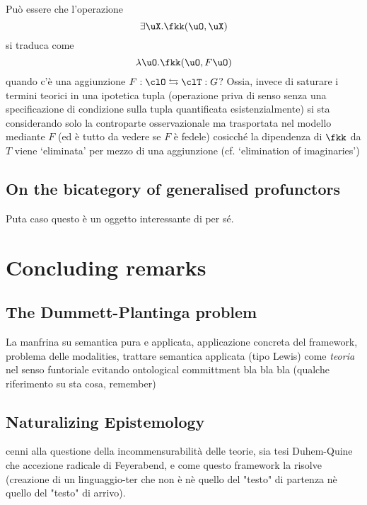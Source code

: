 \documentclass[a4paper]{../birkjour}
\begin{document}
Può essere che l'operazione 
\[\exists \uX . \fkk(\uO, \uX)\]
si traduca come 
\[\lambda \uO.\fkk(\uO, F\uO)\]
quando c'è una aggiunzione $F : \clO \leftrightarrows \clT : G$? Ossia, invece di saturare i termini teorici in una ipotetica tupla (operazione priva di senso senza una specificazione di condizione sulla tupla quantificata esistenzialmente) si sta considerando solo la controparte osservazionale ma trasportata nel modello mediante $F$ (ed è tutto da vedere se $F$ è fedele) cosicché la dipendenza di $\fkk$ da $T$ viene `eliminata' per mezzo di una aggiunzione (cf. `elimination of imaginaries')
\subsection{On the bicategory of generalised profunctors}
Puta caso questo è un oggetto interessante di per sé.

\section{Concluding remarks}

\subsection{The Dummett-Plantinga problem}
La manfrina su semantica pura e applicata, applicazione concreta del framework, problema delle modalities, trattare semantica applicata (tipo Lewis) come \emph{teoria} nel senso funtoriale evitando ontological committment bla bla bla (qualche riferimento su sta cosa, remember)

\subsection{Naturalizing Epistemology}
cenni alla questione della incommensurabilità delle teorie, sia tesi Duhem-Quine che accezione radicale di Feyerabend, e come questo framework la risolve (creazione di un linguaggio-ter che non è nè quello del "testo" di partenza nè quello del "testo" di arrivo). 
 
{}

\end{document}

